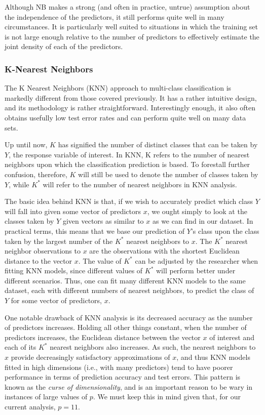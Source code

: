 \documentclass[12pt]{article}
\begin{document}
Although NB makes a strong (and often in practice, untrue) assumption about the independence 
of the predictors, it still performs quite well in many circumstances.  It is particularly 
well suited to situations in which the training set is not large enough relative to the number 
of predictors to effectively estimate the joint density of each of the predictors.  

\subsubsection{K-Nearest Neighbors}
\label{sec:knn}

The K Nearest Neighbors (KNN) approach to multi-class classification is markedly different 
from those covered previously.  It has a rather intuitive design, and its methodology is 
rather straightforward.  Interestingly enough, it also often obtains usefully low test error 
rates and can perform quite well on many data sets.  

Up until now, $K$ has signified the number of distinct classes that can be taken by $Y$, the 
response variable of interest.  In KNN, K refers to the number of nearest neighbors upon 
which the classification prediction is based.  To forestall further confusion, therefore, 
$K$ will still be used to denote the number of classes taken by $Y$, while $K ^ *$ will refer 
to the number of nearest neighbors in KNN analysis.  

The basic idea behind KNN is that, if we wish to accurately predict which class $Y$ will fall 
into given some vector of predictors $x$, we ought simply to look at the classes taken by $Y$ 
given vectors as similar to $x$ as we can find in our dataset.  In practical terms, this means 
that we base our prediction of $Y$'s class upon the class taken by the largest number of the 
$K ^ *$ nearest neighbors to $x$.  The $K ^ *$ nearest neighbor observations to $x$ are the 
observations with the shortest Euclidean distance to the vector $x$.  The value of $K ^ *$ can 
be adjusted by the researcher when fitting KNN models, since different values of $K ^ *$ will 
perform better under different scenarios.  Thus, one can fit many different KNN models to the 
same dataset, each with different numbers of nearest neighbors, to predict the class of $Y$ 
for some vector of predictors, $x$.  

One notable drawback of KNN analysis is its decreased accuracy as the number of predictors 
increases.  Holding all other things constant, when the number of predictors increases, the 
Euclidean distance between the vector $x$ of interest and each of its $K ^ *$ nearest neighbors 
also increases.  As such, the nearest neighbors to $x$ provide decreasingly satisfactory 
approximations of $x$, and thus KNN models fitted in high dimensions (i.e., with many 
predictors) tend to have poorer performance in terms of prediction accuracy and test errors.  
This pattern is known as the \textit{curse of dimensionality}, and is an important reason to 
be wary in instances of large values of $p$.  We must keep this in mind given that, for our 
current analysis, $p = 11$. 
\end{document}
